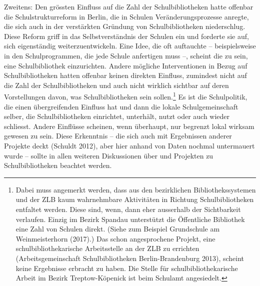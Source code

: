 \documentclass[a4paper,
fontsize=11pt,
oneside,
numbers=noperiodatend,
parskip=half-,
bibliography=totoc,
final
]{scrartcl}
\begin{document}
Zweitens: Den grössten Einfluss auf die Zahl der Schulbibliotheken hatte
offenbar die Schulstrukturreform in Berlin, die in Schulen
Veränderungsprozesse anregte, die sich auch in der verstärkten Gründung
von Schulbibliotheken niederschlug. Diese Reform griff in das
Selbstverständnis der Schulen ein und forderte sie auf, sich
eigenständig weiterzuentwickeln. Eine Idee, die oft auftauchte --
beispielsweise in den Schulprogrammen, die jede Schule anfertigen muss
--, scheint die zu sein, eine Schulbibliothek einzurichten. Andere
mögliche Interventionen in Bezug auf Schulbibliotheken hatten offenbar
keinen direkten Einfluss, zumindest nicht auf die Zahl der
Schulbibliotheken und auch nicht wirklich sichtbar auf deren
Vorstellungen davon, was Schulbibliotheken sein sollen.\footnote{Dabei
  muss angemerkt werden, dass aus den bezirklichen Bibliothekssystemen
  und der ZLB kaum wahrnehmbare Aktivitäten in Richtung
  Schulbibliotheken entfaltet werden. Diese sind, wenn, dann eher
  ausserhalb der Sichtbarkeit verlaufen. Einzig im Bezirk Spandau
  unterstützt die Öffentliche Bibliothek eine Zahl von Schulen direkt.
  (Siehe zum Beispiel Grundschule am Weinmeisterhorn (2017).) Das schon
  angesprochene Projekt, eine schulbibliothekarische Arbeitsstelle an
  der ZLB zu errichten (Arbeitsgemeinschaft Schulbibliotheken
  Berlin-Brandenburg 2013), scheint keine Ergebnisse erbracht zu haben.
  Die Stelle für schulbibliothekarische Arbeit im Bezirk
  Treptow-Köpenick ist beim Schulamt angesiedelt.} Es ist die
Schulpolitik, die einen übergreifenden Einfluss hat und dann die lokale
Schulgemeinschaft selber, die Schulbibliotheken einrichtet, unterhält,
nutzt oder auch wieder schliesst. Andere Einflüsse scheinen, wenn
überhaupt, nur begrenzt lokal wirksam gewesen zu sein. Diese Erkenntnis
-- die sich auch mit Ergebnissen anderer Projekte deckt (Schuldt 2012),
aber hier anhand von Daten nochmal untermauert wurde -- sollte in allen
weiteren Diskussionen über und Projekten zu Schulbibliotheken beachtet
werden.
\end{document}
